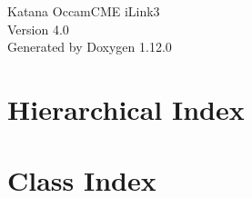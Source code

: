\documentclass[twoside]{book}
\newcommand{\+}{\discretionary{\mbox{\scriptsize$\hookleftarrow$}}{}{}}
\newcommand{\clearemptydoublepage}{%
    \newpage{\pagestyle{empty}\cleardoublepage}%
  }
\begin{document}
  \raggedbottom
    \hypersetup{pageanchor=false,
                bookmarksnumbered=true,
                pdfencoding=unicode
               }
  \begin{titlepage}
  \vspace*{7cm}
  \begin{center}%
  {\Large Katana Occam\+CME i\+Link3}\\
  [1ex]\large Version 4.\+0 \\
  \vspace*{1cm}
  {\large Generated by Doxygen 1.12.0}\\
  \end{center}
  \end{titlepage}
  \clearemptydoublepage
  \tableofcontents
  \clearemptydoublepage
  \hypersetup{pageanchor=true}

\chapter{Hierarchical Index}

\chapter{Class Index}

\end{document}
